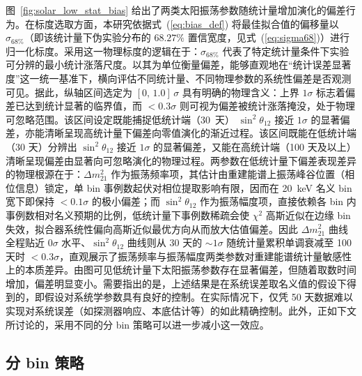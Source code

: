 图~\ref{fig:solar_low_stat_bias} 给出了两类太阳振荡参数随统计量增加演化的偏差行为。在标度选取方面，本研究依据式~(\ref{eq:bias_def}) 将最佳拟合值的偏移量以 $\sigma_{68\%}$（即该统计量下伪实验分布的 $68.27\%$ 置信宽度，见式~(\ref{eq:sigma68})）进行归一化标度。采用这一物理标度的逻辑在于：$\sigma_{68\%}$ 代表了特定统计量条件下实验可分辨的最小统计涨落尺度。以其为单位衡量偏差，能够直观地在“统计误差显著度”这一统一基准下，横向评估不同统计量、不同物理参数的系统性偏差是否观测可见。据此，纵轴区间选定为 $[0,\,1.0]\,\sigma$ 具有明确的物理含义：上界 $1\sigma$ 标志着偏差已达到统计显著的临界值，而 $<\!0.3\sigma$ 则可视为偏差被统计涨落掩没，处于物理可忽略范围。该区间设定既能捕捉低统计端（30~天） $\sin^2\theta_{12}$ 接近 $1\sigma$ 的显著偏差，亦能清晰呈现高统计量下偏差向零值演化的渐近过程。该区间既能在低统计端（30 天）分辨出 $\sin^2\theta_{12}$ 接近 $1\sigma$ 的显著偏差，又能在高统计端（100 天及以上）清晰呈现偏差由显著向可忽略演化的物理过程。两参数在低统计量下偏差表现差异的物理根源在于：$\Delta m^2_{21}$ 作为振荡频率项，其估计由重建能谱上振荡峰谷位置（相位信息）锁定，单 bin 事例数起伏对相位提取影响有限，因而在 20~keV 名义 bin 宽下即保持 $<\!0.1\sigma$ 的极小偏差；而 $\sin^2\theta_{12}$ 作为振荡幅度项，直接依赖各 bin 内事例数相对名义预期的比例，低统计量下事例数稀疏会使 $\chi^2$ 高斯近似在边缘 bin 失效，拟合器系统性偏向高斯近似最优方向从而放大估值偏差。因此 $\Delta m^2_{21}$ 曲线全程贴近 $0\sigma$ 水平、$\sin^2\theta_{12}$ 曲线则从 30 天的 $\sim\!1\sigma$ 随统计量累积单调衰减至 100 天时 $<\!0.3\sigma$，直观展示了振荡频率与振荡幅度两类参数对重建能谱统计量敏感性上的本质差异。由图可见低统计量下太阳振荡参数存在显著偏差，但随着取数时间增加，偏差明显变小。需要指出的是，上述结果是在系统误差取名义值的假设下得到的，即假设对系统学参数具有良好的控制。在实际情况下，仅凭 50 天数据难以实现对系统误差（如探测器响应、本底估计等）的如此精确控制。此外，正如下文所讨论的，采用不同的分 bin 策略可以进一步减小这一效应。

\subsection{分 bin 策略}\label{sec:binning_solar}

